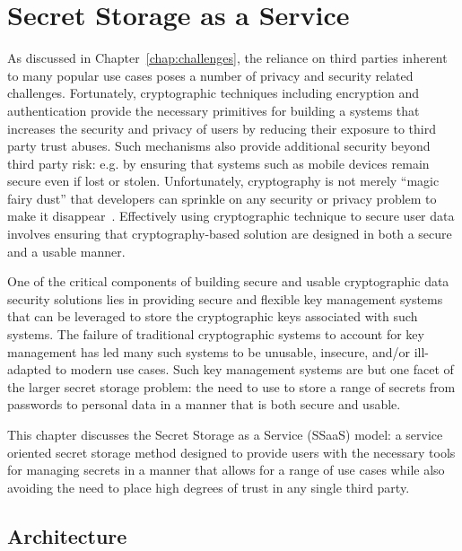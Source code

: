 \chapter{Secret Storage as a Service}
\label{chap:ssaas}

As discussed in Chapter~\ref{chap:challenges}, the reliance on third
parties inherent to many popular use cases poses a number of privacy
and security related challenges. Fortunately, cryptographic techniques
including encryption and authentication provide the necessary
primitives for building a systems that increases the security and
privacy of users by reducing their exposure to third party trust
abuses. Such mechanisms also provide additional security beyond third
party risk: e.g. by ensuring that systems such as mobile devices remain
secure even if lost or stolen. Unfortunately, cryptography is not
merely ``magic fairy dust'' that developers can sprinkle on any
security or privacy problem to make it
disappear~\cite{smith2003}. Effectively using cryptographic technique
to secure user data involves ensuring that cryptography-based solution
are designed in both a secure and a usable manner.

One of the critical components of building secure and usable
cryptographic data security solutions lies in providing secure and
flexible key management systems that can be leveraged to store the
cryptographic keys associated with such systems. The failure of
traditional cryptographic systems to account for key management has
led many such systems to be unusable, insecure, and/or ill-adapted to
modern use cases. Such key management systems are but one facet of the
larger secret storage problem: the need to use to store a range of
secrets from passwords to personal data in a manner that is both
secure and usable.

This chapter discusses the Secret Storage as a Service (SSaaS) model:
a service oriented secret storage method designed to provide users
with the necessary tools for managing secrets in a manner that allows
for a range of use cases while also avoiding the need to place high
degrees of trust in any single third party.

\section{Architecture}
\label{chap:ssaas:arch}

